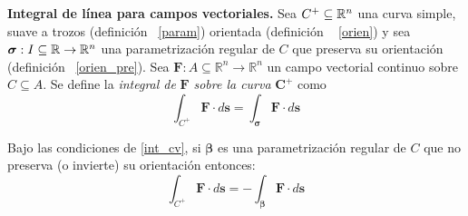 

\begin{definition}\label{int_cv} \textbf{Integral de l\'inea para campos vectoriales.}
  Sea $C^{+} \subseteq  \mathbb{R}^n$  una curva simple,  suave a trozos  (definición ~\ref{param}) orientada (definición ~ \ref{orien})  y sea $\boldsymbol{\sigma}:I\subseteq\mathbb{R}\to\mathbb{R}^n $ una parametrizaci\'on regular de $C$ que preserva su orientaci\'on  (definición ~\ref{orien_pre}). Sea $\mathbf{F}:A\subseteq\mathbb{R}^n \to\mathbb{R}^n $ un campo vectorial continuo sobre $C  \subseteq  A.$  Se define la \emph{integral de} $\mathbf{F}$ \emph{sobre la curva} $\boldsymbol{C}^{+}$ como
    \[
        \int_{C^{+}}\mathbf{F}\cdot d\mathbf{s}=\int_{\boldsymbol{\sigma}}\mathbf{F}\cdot d\mathbf{s} 
    \]
\end{definition}

\begin{obs} Bajo las condiciones de \ref{int_cv}, si $\boldsymbol{\beta}$ es una parametrizaci\'on regular de $C$ que no  preserva (o invierte) su orientaci\'on entonces: 
 \[
        \int_{C^{+}}\mathbf{F}\cdot d\mathbf{s}= - \int_{\boldsymbol{\beta}}\mathbf{F}\cdot d\mathbf{s} 
    \]
\end{obs}


